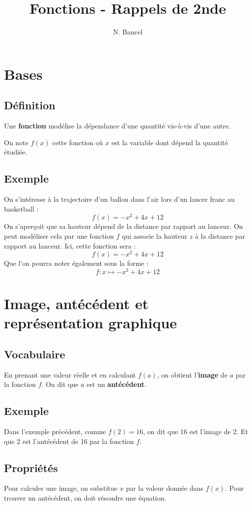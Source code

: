 \documentclass[a4paper,12pt]{article}
\begin{document}
\title{Fonctions - Rappels de 2nde}
\author{N. Bancel}

\section*{Bases}
\subsection*{Définition}
Une \textbf{fonction} modélise la dépendance d'une quantité vis-à-vis d'une autre.

On note \( f(x) \) cette fonction où \( x \) est la variable dont dépend la quantité étudiée.

\subsection*{Exemple}
On s'intéresse à la trajectoire d'un ballon dans l'air lors d'un lancer franc au basketball :
\[
f(x) = -x^2 + 4x + 12
\]
On s'aperçoit que sa hauteur dépend de la distance par rapport au lanceur. On peut modéliser cela par une fonction \( f \) qui associe la hauteur \( z \) à la distance par rapport au lanceur. Ici, cette fonction sera :
\[
f(x) = -x^2 + 4x + 12
\]
Que l'on pourra noter également sous la forme :
\[
f : x \mapsto -x^2 + 4x + 12
\]

\section*{Image, antécédent et représentation graphique}
\subsection*{Vocabulaire}
En prenant une valeur réelle et en calculant \( f(a) \), on obtient l'\textbf{image} de \( a \) par la fonction \( f \). On dit que \( a \) est un \textbf{antécédent}.

\subsection*{Exemple}
Dans l'exemple précédent, comme \( f(2) = 16 \), on dit que 16 est l'image de 2. Et que 2 est l'antécédent de 16 par la fonction \( f \).

\subsection*{Propriétés}
Pour calculer une image, on substitue \( x \) par la valeur donnée dans \( f(x) \). Pour trouver un antécédent, on doit résoudre une équation.
\end{document}
